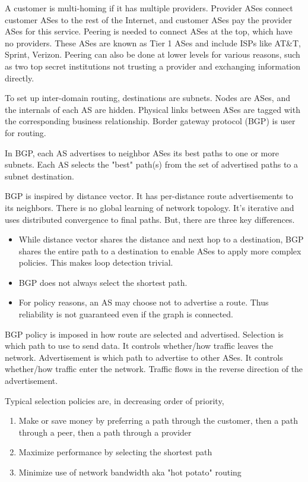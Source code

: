 A customer is multi-homing if it has multiple providers. Provider ASes connect
customer ASes to the rest of the Internet, and customer ASes
pay the provider ASes for this service. Peering is needed to connect ASes
at the top, which have no providers. These ASes are known as Tier 1 ASes and
include ISPs like AT\&T, Sprint, Verizon. Peering can also be done at lower
levels for various reasons, such as two top secret institutions not trusting
a provider and exchanging information directly.

To set up inter-domain routing, destinations are subnets. Nodes are ASes, and
the internals of each AS are hidden. Physical links between ASes are tagged
with the corresponding business relationship. Border gateway protocol (BGP) is
user for routing.

In BGP, each AS advertises to neighbor ASes its best paths to one or more
subnets. Each AS selects the "best" path(s) from the set of advertised paths
to a subnet destination.

BGP is inspired by distance vector. It has per-distance route advertisements to
its neighbors. There is no global learning of network topology. It's iterative
and uses distributed convergence to final paths. But, there are three key differences.

\begin{itemize}
    \item While distance vector shares the distance and next hop to a destination,
          BGP shares the entire path to a destination to enable ASes to apply more
          complex policies. This makes loop detection trivial.
    \item BGP does not always select the shortest path.
    \item For policy reasons, an AS may choose not to advertise a route. Thus
          reliability is not guaranteed even if the graph is connected.
\end{itemize}

BGP policy is imposed in how route are selected and advertised. Selection
is which path to use to send data. It controls whether/how traffic leaves
the network. Advertisement is which path to advertise to other ASes. It
controls whether/how traffic enter the network. Traffic flows in the reverse
direction of the advertisement.

Typical selection policies are, in decreasing order of priority,
\begin{enumerate}
    \item Make or save money by preferring a path through the customer,
          then a path through a peer, then a path through a provider
    \item Maximize performance by selecting the shortest path
    \item Minimize use of network bandwidth aka "hot potato" routing
\end{enumerate}

